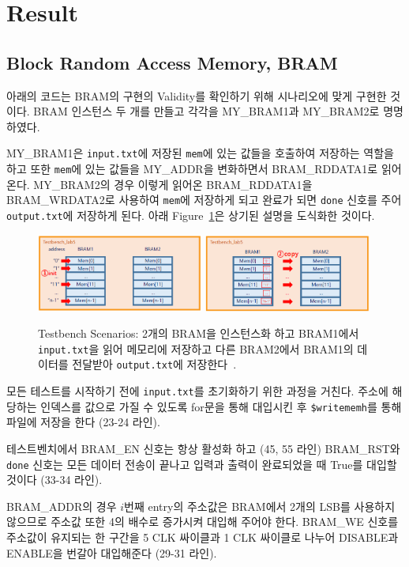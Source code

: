 \documentclass{article}
\begin{document}
\newpage
\section{Result}

\subsection{Block Random Access Memory, BRAM}
아래의 코드는 BRAM의 구현의 Validity를 확인하기 위해 시나리오에 맞게 구현한 것이다. BRAM 인스턴스 두 개를 만들고 각각을 MY\_BRAM1과 MY\_BRAM2로 명명하였다. 

MY\_BRAM1은 \texttt{input.txt}에 저장된 \texttt{mem}에 있는 값들을 호출하여 저장하는 역할을 하고 또한 \texttt{mem}에 있는 값들을 MY\_ADDR을 변화하면서 BRAM\_RDDATA1로 읽어온다. MY\_BRAM2의 경우 이렇게 읽어온 \linebreak BRAM\_RDDATA1을 BRAM\_WRDATA2로 사용하여 \texttt{mem}에 저장하게 되고 완료가 되면 \texttt{done} 신호를 주어 \linebreak \texttt{output.txt}에 저장하게 된다. 아래 Figure~\ref{fig1}은 상기된 설명을 도식화한 것이다.
\begin{figure}[ht]
	\centering
	\includegraphics[width=0.49\textwidth]{fig/fig1.png}
	\includegraphics[width=0.49\textwidth]{fig/fig2.png}
\caption{Testbench Scenarios: 2개의 BRAM을 인스턴스화 하고 BRAM1에서 \texttt{input.txt}을 읽어 메모리에 저장하고 다른 BRAM2에서 BRAM1의 데이터를 전달받아  \texttt{output.txt}에 저장한다~\cite{lab}. }
\label{fig1}
\end{figure}
\begin{itemize*}
\item 모든 테스트를 시작하기 전에 \texttt{input.txt}를 초기화하기 위한 과정을 거친다. 주소에 해당하는 인덱스를 값으로 가질 수 있도록 for문을 통해 대입시킨 후 \texttt{\$writememh}를 통해 파일에 저장을 한다 (23-24 라인).\\
\item 테스트벤치에서 BRAM\_EN 신호는 항상 활성화 하고 (45, 55 라인) BRAM\_RST와 \texttt{done} 신호는 모든 데이터 전송이 끝나고 입력과 출력이 완료되었을 때 True를 대입할 것이다 (33-34 라인).\\
\item BRAM\_ADDR의 경우 $i$번째 entry의 주소값은 BRAM에서 2개의 LSB를 사용하지 않으므로 주소값 또한 4의 배수로 증가시켜 대입해 주어야 한다. BRAM\_WE 신호를 주소값이 유지되는 한 구간을 5 CLK 싸이클과 1 CLK 싸이클로 나누어 DISABLE과 ENABLE을 번갈아 대입해준다 (29-31 라인).
\end{itemize*}
\newpage
\end{document}
